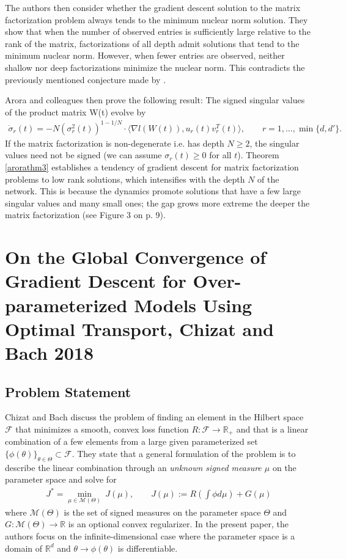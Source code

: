 \documentclass{article}
\newenvironment{manualtheorem}[1]{%
  \renewcommand\themanualtheoreminner{#1}%
  \manualtheoreminner
}{\endmanualtheoreminner}
\begin{document}
The authors then consider whether the gradient descent solution to the matrix factorization problem always tends to the minimum nuclear norm solution. They show that when the number of observed entries is sufficiently large relative to the rank of the matrix, factorizations of all depth admit solutions that tend to the minimum nuclear norm. However, when fewer entries are observed, neither shallow nor deep factorizations minimize the nuclear norm. This contradicts the previously mentioned conjecture made by \cite{gunasekar2018implicit}.

Arora and colleagues then prove the following result:
\begin{manualtheorem}{3}\label{arorathm3}
The signed singular values of the product matrix W(t) evolve by 
\begin{align*}
    \dot{\sigma}_r(t) = -N (\sigma_r^2(t))^{1-1/N} \cdot \langle \nabla l(W(t)), u_r(t)v_r^T(t) \rangle, \qquad r = 1, \ldots, \min\{d, d'\}.
\end{align*}
If the matrix factorization is non-degenerate i.e. has depth $N \geq 2$, the singular values need not be signed (we can assume $\sigma_r(t) \geq 0$ for all $t$).
\end{manualtheorem}
Theorem \ref{arorathm3} establishes a tendency of gradient descent for matrix factorization problems to low rank solutions, which intensifies with the depth $N$ of the network. This is because the dynamics promote solutions that have a few large singular values and many small ones; the gap grows more extreme the deeper the matrix factorization (see Figure 3 on p. 9).

\section{On the Global Convergence of Gradient Descent for Over-parameterized Models Using Optimal Transport, Chizat and Bach 2018}

\subsection{Problem Statement}
Chizat and Bach discuss the problem of finding an element in the Hilbert space $\mathcal{F}$ that minimizes a smooth, convex loss function $R: \mathcal{F} \rightarrow \mathbb{R}_+$ and that is a linear combination of a few elements from a large given parameterized set $\{ \phi(\theta) \}_{\theta \in \Theta} \subset \mathcal{F}$. They state that a general formulation of the problem is to describe the linear combination through an \textit{unknown signed measure $\mu$} on the parameter space and solve for
\begin{align*}
    J^* = \underset{\mu \in \mathcal{M}(\Theta)}{\min} \ J(\mu), \qquad J(\mu) := R \left( \int \phi d\mu \right) + G(\mu)
\end{align*}
where $\mathcal{M}(\Theta)$ is the set of signed measures on the parameter space $\Theta$ and $G: \mathcal{M}(\Theta) \rightarrow \mathbb{R}$ is an optional convex regularizer. In the present paper, the authors focus on the infinite-dimensional case where the parameter space is a domain of $\mathbb{R}^d$ and $\theta \rightarrow \phi(\theta)$ is differentiable.
\end{document}
